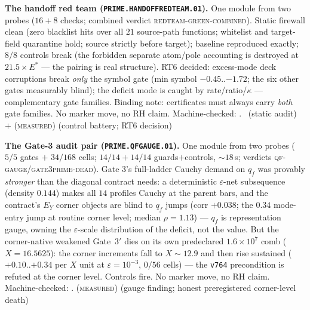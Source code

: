\documentclass[11pt,a4paper]{article}
\theoremstyle{definition}
\begin{document}
\par\smallskip\noindent\textbf{The handoff red team
(\texttt{PRIME.HANDOFFREDTEAM.01}).}
One module from two probes ($16{+}8$ checks; combined verdict
\textsc{redteam-green-combined}).  Static firewall clean (zero
blacklist hits over all $21$ source-path functions; whitelist and
target-field quarantine hold; source strictly before target);
baseline reproduced exactly; $8/8$ controls break (the forbidden
separate atom/pole accounting is destroyed at $21.5\times E^*$ ---
the pairing is real structure).  RT6 decided: excess-mode deck
corruptions break \emph{only} the symbol gate (min symbol
$-0.45$..$-1.72$; the six other gates measurably blind); the
deficit mode is caught by rate/ratio/$\kappa$ --- complementary
gate families.  Binding note: certificates must always carry
\emph{both} gate families.  No marker move, no RH claim.
Machine-checked: .
\mE\ (static audit) $+$ (\textsc{measured}) (control battery; RT6
decision)
\par\smallskip

\par\smallskip\noindent\textbf{The Gate-3 audit pair
(\texttt{PRIME.QFGAUGE.01}).}
One module from two probes ($5/5$ gates $+$ $34/168$ cells;
$14/14+14/14$ guards$+$controls, ${\sim}18$\,s; verdicts
\textsc{qf-gauge}/\textsc{gate3prime-dead}).  Gate 3's full-ladder
Cauchy demand on $q_f$ was provably \emph{stronger} than the
diagonal contract needs: a deterministic $\varepsilon$-net
subsequence (density $0.144$) makes all $14$ profiles Cauchy at
the parent bars, and the contract's $E_Y$ corner objects are blind
to $q_f$ jumps (corr $+0.038$; the $0.34$ mode-entry jump at
routine corner level; median $\rho=1.13$) --- $q_f$ is
representation gauge, owning the $\varepsilon$-scale distribution
of the deficit, not the value.  But the corner-native weakened
Gate~$3'$ dies on its own predeclared $1.6\times10^{7}$ comb
($X=16.5625$): the corner increments fall to $X\sim12.9$ and then
rise sustained ($+0.10$..$+0.34$ per $X$ unit at
$\varepsilon=10^{-3}$, $0/56$ cells) --- the \texttt{v764}
precondition is refuted at the corner level.  Controls fire.
No marker move, no RH claim.
Machine-checked: .
(\textsc{measured}) (gauge finding; honest preregistered
corner-level death)
\par\smallskip
\end{document}
